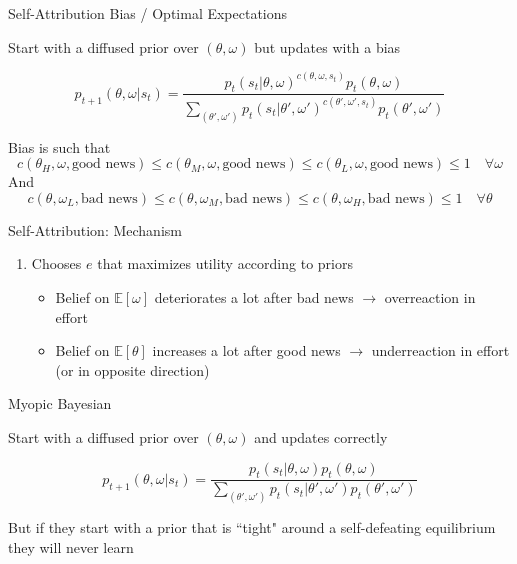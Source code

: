 \documentclass[aspectratio=169]{beamer}
\begin{document}
\begin{frame}{Self-Attribution Bias / Optimal Expectations}

    Start with a diffused prior over $(\theta, \omega)$ but updates with a bias

    $$ p_{t+1}(\theta, \omega| s_t)=\frac{p_t(s_t|\theta, \omega)^{c(\theta, \omega, s_t)}p_t(\theta, \omega)}{\sum_{(\theta', \omega')}p_t(s_t|\theta', \omega')^{c(\theta', \omega', s_t)}p_t(\theta', \omega')} $$

    Bias is such that 
    $$c(\theta_H, \omega, \text{good news}) \leq c(\theta_M, \omega, \text{good news}) \leq c(\theta_L, \omega, \text{good news})\leq1 \quad \forall \omega$$
    And
    $$c(\theta, \omega_L, \text{bad news}) \leq c(\theta, \omega_M, \text{bad news}) \leq c(\theta, \omega_H, \text{bad news})\leq1 \quad \forall \theta$$
    

\end{frame}

\begin{frame}{Self-Attribution: Mechanism}
    \begin{enumerate}
        \item Chooses $e$ that maximizes utility according to priors
        \bigskip
        \begin{itemize}
            \item Belief on $\mathbb{E}[\omega]$ deteriorates a lot after bad news $\to$ overreaction in effort
            \item Belief on $\mathbb{E}[\theta]$ increases a lot after good news $\to$ underreaction in effort (or in opposite direction) \\
        \end{itemize}
    \end{enumerate}

    \label{sspath}
    
\end{frame}


\begin{frame}{Myopic Bayesian}

    Start with a diffused prior over $(\theta, \omega)$ and updates correctly
    
    $$ p_{t+1}(\theta, \omega| s_t)=\frac{p_t(s_t|\theta, \omega)p_t(\theta, \omega)}{\sum_{(\theta', \omega')}p_t(s_t|\theta', \omega')p_t(\theta', \omega')} $$
    
    But if they start with a prior that is ``tight" 
    around a self-defeating equilibrium they will never learn 
        
\end{frame}
\end{document}
